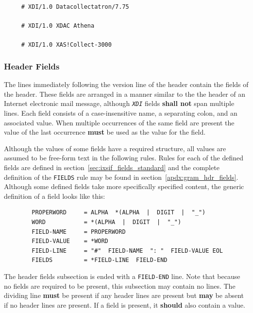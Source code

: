\documentclass{article}
\newcommand{\sltt}[1]{\texttt{\textsl{#1}}}
\newcommand{\xdi}{\sltt{XDI}}
\begin{document}
\begin{verbatim}
     # XDI/1.0 Datacollectatron/7.75

     # XDI/1.0 XDAC Athena

     # XDI/1.0 XAS!Collect-3000
\end{verbatim}


\subsubsection{Header Fields}
\label{sec:def_hdr_fields}

The lines immediately following the version line of the header contain
the fields of the header.  These fields are arranged in a manner
similar to the the header of an Internet electronic mail message,
although {\xdi} fields \textbf{shall not} span multiple lines.  Each
field consists of a case-insensitive name, a separating colon, and an
associated value.  When multiple occurrences of the same field are
present the value of the last occurrence \textbf{must} be used as the
value for the field.

Although the values of some fields have a required structure, all
values are assumed to be free-form text in the following rules.  Rules
for each of the defined fields are defined in
section~\ref{sec:ixsif_fields_standard} and the complete definition of
the \texttt{FIELDS} rule may be found in
section~\ref{apdx:gram_hdr_fields}.  Although some defined fields take
more specifically specified content, the generic definition of a field
looks like this:

\begin{verbatim}
        PROPERWORD     = ALPHA  *(ALPHA  |  DIGIT  |  "_")
        WORD           = *(ALPHA  |  DIGIT  |  "_")
        FIELD-NAME     = PROPERWORD
        FIELD-VALUE    = *WORD
        FIELD-LINE     = "#"  FIELD-NAME  ": "  FIELD-VALUE EOL
        FIELDS         = *FIELD-LINE  FIELD-END
\end{verbatim}

The header fields subsection is ended with a \texttt{FIELD-END} line.
Note that because no fields are required to be present, this
subsection may contain no lines. The dividing line \textbf{must} be
present if any header lines are present but \textbf{may} be absent if
no header lines are present.  If a field is present, it
\textbf{should} also contain a value.
\end{document}
